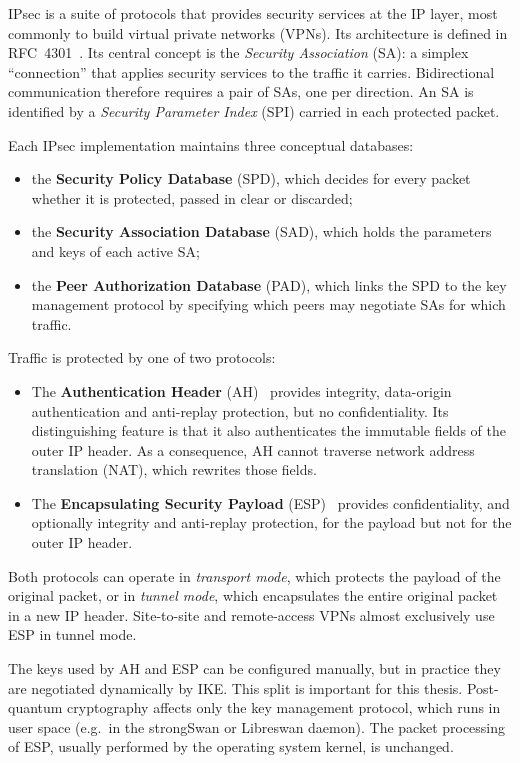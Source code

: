 IPsec is a suite of protocols that provides security services at the IP
layer, most commonly to build virtual private networks (VPNs). Its architecture
is defined in RFC~4301~\cite{rfc4301}. Its central concept is the
\emph{Security Association} (SA): a simplex ``connection'' that applies
security services to the traffic it carries. Bidirectional communication
therefore requires a pair of SAs, one per direction. An SA is identified by
a \emph{Security Parameter Index} (SPI) carried in each protected packet.

Each IPsec implementation maintains three conceptual databases:
\begin{itemize}
    \item the \textbf{Security Policy Database} (SPD), which decides for every
    packet whether it is protected, passed in clear or discarded;
    \item the \textbf{Security Association Database} (SAD), which holds the
    parameters and keys of each active SA;
    \item the \textbf{Peer Authorization Database} (PAD), which links the SPD
    to the key management protocol by specifying which peers may negotiate SAs
    for which traffic.
\end{itemize}

Traffic is protected by one of two protocols:
\begin{itemize}
    \item The \textbf{Authentication Header} (AH)~\cite{rfc4302} provides
    integrity, data-origin authentication and anti-replay protection, but no
    confidentiality. Its distinguishing feature is that it also authenticates
    the immutable fields of the outer IP header. As a consequence, AH cannot
    traverse network address translation (NAT), which rewrites those fields.
    \item The \textbf{Encapsulating Security Payload} (ESP)~\cite{rfc4303}
    provides confidentiality, and optionally integrity and anti-replay
    protection, for the payload but not for the outer IP header.
\end{itemize}
Both protocols can operate in \emph{transport mode}, which protects the payload
of the original packet, or in \emph{tunnel mode}, which encapsulates the entire
original packet in a new IP header. Site-to-site and remote-access VPNs
almost exclusively use ESP in tunnel mode.

The keys used by AH and ESP can be configured manually, but in practice they
are negotiated dynamically by IKE. This split is important for this thesis.
Post-quantum cryptography affects only the key management protocol, which
runs in user space (e.g.\ in the strongSwan or Libreswan daemon). The packet
processing of ESP, usually performed by the operating system kernel, is
unchanged.

